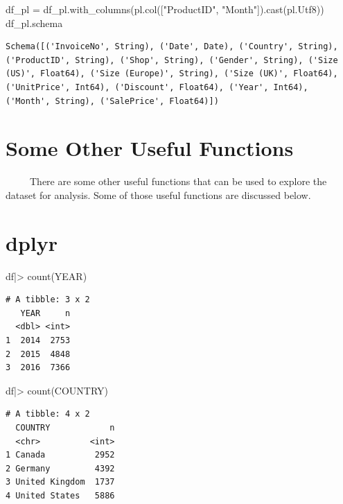\documentclass[
  letterpaper,
  DIV=11,
  numbers=noendperiod]{scrreprt}
\newenvironment{Shaded}{\begin{snugshade}}{\end{snugshade}}
\newcommand{\FunctionTok}[1]{\textcolor[rgb]{0.28,0.35,0.67}{#1}}
\newcommand{\NormalTok}[1]{\textcolor[rgb]{0.00,0.23,0.31}{#1}}
\newcommand{\OperatorTok}[1]{\textcolor[rgb]{0.37,0.37,0.37}{#1}}
\newcommand{\SpecialCharTok}[1]{\textcolor[rgb]{0.37,0.37,0.37}{#1}}
\newcommand{\StringTok}[1]{\textcolor[rgb]{0.13,0.47,0.30}{#1}}
\begin{document}
\begin{Shaded}
\begin{Highlighting}[]
\NormalTok{df\_pl }\OperatorTok{=}\NormalTok{ df\_pl.with\_columns(pl.col([}\StringTok{"ProductID"}\NormalTok{, }\StringTok{"Month"}\NormalTok{]).cast(pl.Utf8))}
\NormalTok{df\_pl.schema}
\end{Highlighting}
\end{Shaded}

\begin{verbatim}
Schema([('InvoiceNo', String), ('Date', Date), ('Country', String), ('ProductID', String), ('Shop', String), ('Gender', String), ('Size (US)', Float64), ('Size (Europe)', String), ('Size (UK)', Float64), ('UnitPrice', Int64), ('Discount', Float64), ('Year', Int64), ('Month', String), ('SalePrice', Float64)])
\end{verbatim}

\section{Some Other Useful Functions}\label{some-other-useful-functions}

~~~~~There are some other useful functions that can be used to explore
the dataset for analysis. Some of those useful functions are discussed
below.

\section{dplyr}

\begin{Shaded}
\begin{Highlighting}[]
\NormalTok{df}\SpecialCharTok{|\textgreater{}} \FunctionTok{count}\NormalTok{(YEAR)}
\end{Highlighting}
\end{Shaded}

\begin{verbatim}
# A tibble: 3 x 2
   YEAR     n
  <dbl> <int>
1  2014  2753
2  2015  4848
3  2016  7366
\end{verbatim}

\begin{Shaded}
\begin{Highlighting}[]
\NormalTok{df}\SpecialCharTok{|\textgreater{}} \FunctionTok{count}\NormalTok{(COUNTRY)}
\end{Highlighting}
\end{Shaded}

\begin{verbatim}
# A tibble: 4 x 2
  COUNTRY            n
  <chr>          <int>
1 Canada          2952
2 Germany         4392
3 United Kingdom  1737
4 United States   5886
\end{verbatim}
\end{document}
